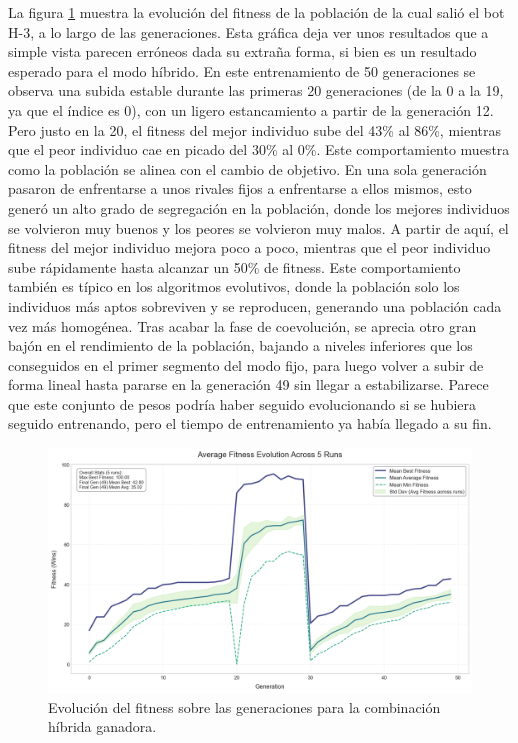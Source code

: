 La figura \ref{fig:fitness_evolution_424} muestra la evolución del fitness de la población de la cual salió el bot H-3, a lo largo de las generaciones. Esta gráfica deja ver unos resultados que a simple vista parecen erróneos dada su extraña forma, si bien es un resultado esperado para el modo híbrido. En este entrenamiento de 50 generaciones se observa una subida estable durante las primeras 20 generaciones (de la 0 a la 19, ya que el índice es 0), con un ligero estancamiento a partir de la generación 12. Pero justo en la 20, el fitness del mejor individuo sube del 43\% al 86\%, mientras que el peor individuo cae en picado del 30\% al 0\%. Este comportamiento muestra como la población se alinea con el cambio de objetivo. En una sola generación pasaron de enfrentarse a unos rivales fijos a enfrentarse a ellos mismos, esto generó un alto grado de segregación en la población, donde los mejores individuos se volvieron muy buenos y los peores se volvieron muy malos. A partir de aquí, el fitness del mejor individuo mejora poco a poco, mientras que el peor individuo sube rápidamente hasta alcanzar un 50\% de fitness. Este comportamiento también es típico en los algoritmos evolutivos, donde la población solo los individuos más aptos sobreviven y se reproducen, generando una población cada vez más homogénea. Tras acabar la fase de coevolución, se aprecia otro gran bajón en el rendimiento de la población, bajando a niveles inferiores que los conseguidos en el primer segmento del modo fijo, para luego volver a subir de forma lineal hasta pararse en la generación 49 sin llegar a estabilizarse. Parece que este conjunto de pesos podría haber seguido evolucionando si se hubiera seguido entrenando, pero el tiempo de entrenamiento ya había llegado a su fin.

\begin{figure}[H]
	\centering
	\includegraphics[width=1.0\textwidth]{img/424_fitness_evolution.png}
	\caption{Evolución del fitness sobre las generaciones para la combinación híbrida ganadora.}
	\label{fig:fitness_evolution_424}
\end{figure}

